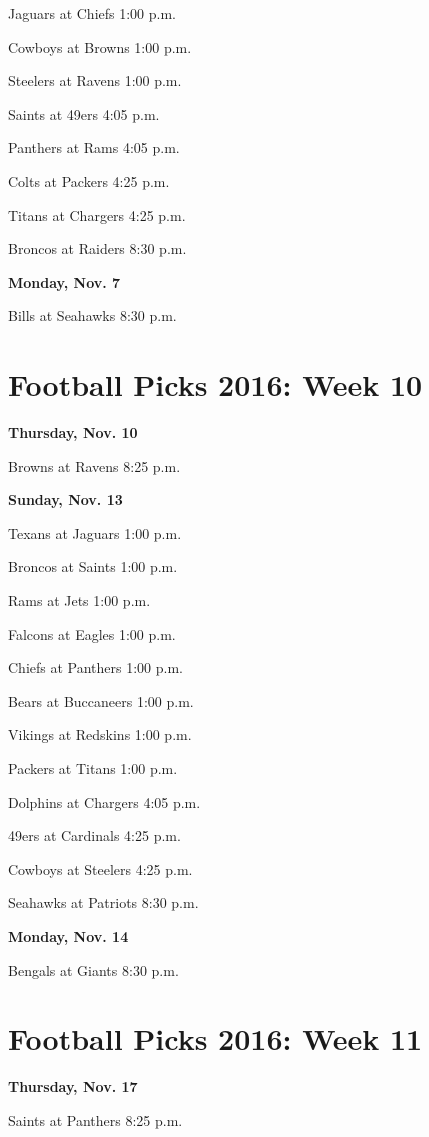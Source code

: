 \documentclass[12pt, letterpaper]{article}
\begin{document}
Jaguars at Chiefs 1:00 p.m.\par
Cowboys at Browns 1:00 p.m.\par
Steelers at Ravens 1:00 p.m.\par
Saints at 49ers 4:05 p.m.\par
Panthers at Rams 4:05 p.m.\par
Colts at Packers 4:25 p.m.\par
Titans at Chargers 4:25 p.m.\par
Broncos at Raiders 8:30 p.m.\par
\noindent \Large \textbf{Monday, Nov. 7} \par
Bills at Seahawks 8:30 p.m.\par
\newpage \section*{\Huge Football Picks 2016: Week 10}
\noindent \Large \textbf{Thursday, Nov. 10} \par
Browns at Ravens 8:25 p.m.\par
\noindent \Large \textbf{Sunday, Nov. 13} \par
Texans at Jaguars 1:00 p.m.\par
Broncos at Saints 1:00 p.m.\par
Rams at Jets 1:00 p.m.\par
Falcons at Eagles 1:00 p.m.\par
Chiefs at Panthers 1:00 p.m.\par
Bears at Buccaneers 1:00 p.m.\par
Vikings at Redskins 1:00 p.m.\par
Packers at Titans 1:00 p.m.\par
Dolphins at Chargers 4:05 p.m.\par
49ers at Cardinals 4:25 p.m.\par
Cowboys at Steelers 4:25 p.m.\par
Seahawks at Patriots 8:30 p.m.\par
\noindent \Large \textbf{Monday, Nov. 14} \par
Bengals at Giants 8:30 p.m.\par
\newpage \section*{\Huge Football Picks 2016: Week 11}
\noindent \Large \textbf{Thursday, Nov. 17} \par
Saints at Panthers 8:25 p.m.\par
\end{document}
